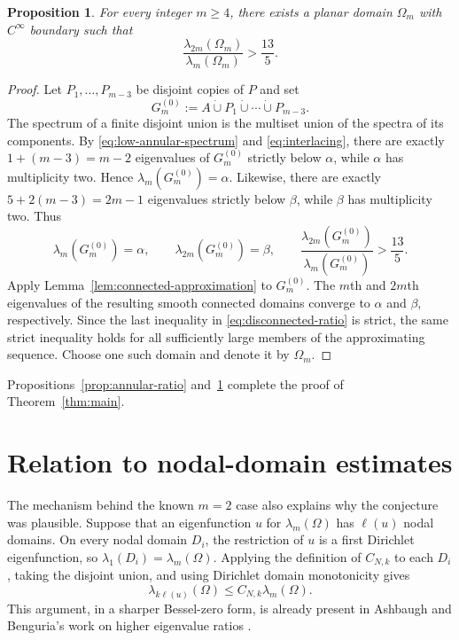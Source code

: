\documentclass[11pt,letterpaper,reqno]{amsart}
\newtheorem{proposition}[proposition]{Proposition}
\theoremstyle{definition}
\begin{document}
\begin{proposition}\label{prop:all-indices}
For every integer $m\geq4$, there exists a planar domain $\Omega_m$ with
$C^\infty$ boundary such that
\[
 \frac{\lambda_{2m}(\Omega_m)}{\lambda_m(\Omega_m)}>\frac{13}{5}.
\]
\end{proposition}

\begin{proof}
Let $P_1,\ldots,P_{m-3}$ be disjoint copies of $P$ and set
\[
 G_m^{(0)}:=A\mathbin{\dot\cup}P_1\mathbin{\dot\cup}\cdots
 \mathbin{\dot\cup}P_{m-3}.
\]
The spectrum of a finite disjoint union is the multiset union of the spectra
of its components.  By \eqref{eq:low-annular-spectrum} and
\eqref{eq:interlacing}, there are exactly
$1+(m-3)=m-2$ eigenvalues of $G_m^{(0)}$ strictly below $\alpha$, while
$\alpha$ has multiplicity two.  Hence $\lambda_m(G_m^{(0)})=\alpha$.
Likewise, there are exactly $5+2(m-3)=2m-1$ eigenvalues strictly below
$\beta$, while $\beta$ has multiplicity two.  Thus
\begin{equation}\label{eq:disconnected-ratio}
 \lambda_m(G_m^{(0)})=\alpha,
 \qquad
 \lambda_{2m}(G_m^{(0)})=\beta,
 \qquad
 \frac{\lambda_{2m}(G_m^{(0)})}{\lambda_m(G_m^{(0)})}>\frac{13}{5}.
\end{equation}
Apply Lemma~\ref{lem:connected-approximation} to $G_m^{(0)}$.  The $m$th and
$2m$th eigenvalues of the resulting smooth connected domains converge to
$\alpha$ and $\beta$, respectively. Since the last inequality in \eqref{eq:disconnected-ratio} is strict,
the same strict inequality holds for all sufficiently large members of the
approximating sequence. Choose one such domain and denote it by $\Omega_m$.
\end{proof}

Propositions~\ref{prop:annular-ratio} and~\ref{prop:all-indices} complete the
proof of Theorem~\ref{thm:main}.


\section{Relation to nodal-domain estimates}\label{sec:nodal}

The mechanism behind the known $m=2$ case also explains why the conjecture
was plausible.  Suppose that an eigenfunction $u$ for $\lambda_m(\Omega)$
has $\ell(u)$ nodal domains.  On every nodal domain $D_i$, the restriction of
$u$ is a first Dirichlet eigenfunction, so
$\lambda_1(D_i)=\lambda_m(\Omega)$.  Applying the definition of $C_{N,k}$ to
each $D_i$, taking the disjoint union, and using Dirichlet domain monotonicity
gives
\begin{equation}\label{eq:nodal-bound}
 \lambda_{k\ell(u)}(\Omega)
 \leq C_{N,k}\lambda_m(\Omega).
\end{equation}
This argument, in a sharper Bessel-zero form, is already present in
Ashbaugh and Benguria's work on higher eigenvalue ratios
\cite{AshbaughBenguria1993}.
\end{document}
